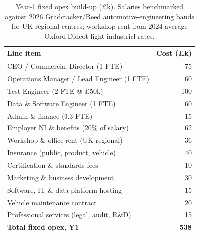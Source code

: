 \begin{table}[H]
\centering
\small
\caption{Year-1 fixed opex build-up (\pounds k). Salaries benchmarked 
against 2026 Gradcracker/Reed automotive-engineering bands for UK regional 
centres; workshop rent from 2024 average Oxford-Didcot light-industrial 
rates.}
\label{tab:opex_breakdown}
\begin{tabular}{lr}
\toprule
\textbf{Line item} & \textbf{Cost (\pounds k)} \\
\midrule
CEO / Commercial Director (1 FTE) & 75 \\
Operations Manager / Lead Engineer (1 FTE) & 60 \\
Test Engineer (2 FTE @ \pounds50k) & 100 \\
Data \& Software Engineer (1 FTE) & 60 \\
Admin \& finance (0.3 FTE) & 15 \\
Employer NI \& benefits (20\% of salary) & 62 \\
Workshop \& office rent (UK regional) & 36 \\
Insurance (public, product, vehicle) & 40 \\
Certification \& standards fees & 10 \\
Marketing \& business development & 30 \\
Software, IT \& data platform hosting & 15 \\
Vehicle maintenance contract & 20 \\
Professional services (legal, audit, R\&D) & 15 \\
\midrule
\textbf{Total fixed opex, Y1} & \textbf{538} \\
\bottomrule
\end{tabular}
\end{table}

